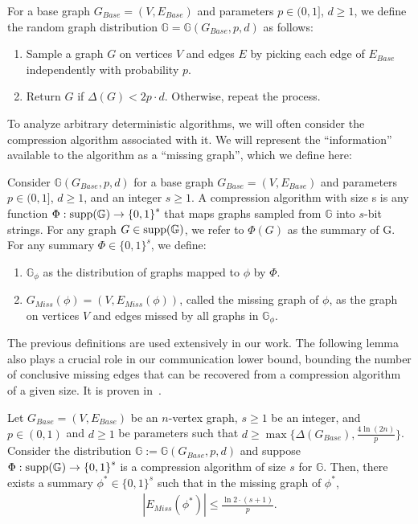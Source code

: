 \documentclass[11pt]{article}
\begin{document}
\begin{definition}
    For a base graph $G_{Base}=(V, E_{Base})$ and parameters $p\in (0, 1]$, $d\ge 1$, we define the random graph distribution $\mathbb{G}=\mathbb{G}(G_{Base}, p, d)$ as follows:
    \begin{enumerate}
        \item Sample a graph $G$ on vertices $V$ and edges $E$ by picking each edge of $E_{Base}$ independently with probability $p$. 
        \item Return $G$ if $\Delta{(G)}< 2p\cdot d$. Otherwise, repeat the process.
    \end{enumerate}
\end{definition}

To analyze arbitrary deterministic algorithms, we will often consider the compression algorithm associated with it. We will represent the ``information'' available to the algorithm as a ``missing graph'', which we define here:
\begin{definition}
    Consider $\mathbb{G}(G_{Base}, p, d)$ for a base graph $G_{Base}=(V, E_{Base})$ and parameters $p\in(0, 1]$, $d\ge 1$, and an integer $s\ge 1$. A compression algorithm with size s is any function $\Phi : \textnormal{\text{supp}}(\mathbb{G}) \rightarrow {\{0, 1\}}^s$ that maps graphs sampled from $\mathbb{G}$ into $s$-bit strings. For any graph $G\in \textnormal{\text{supp}}(\mathbb{G})$, we refer to $\Phi(G)$ as the summary of G. For any summary $\Phi\in{\{0,1\}}^s$, we define:
    \begin{enumerate}
        \item $\mathbb{G}_{\phi}$ as the distribution of graphs mapped to $\phi$ by $\Phi$. 
        \item $G_{Miss}(\phi)=(V, E_{Miss}(\phi))$, called the missing graph of $\phi$, as the graph on vertices $V$ and edges missed by all graphs in $\mathbb{G}_{\phi}$. 
    \end{enumerate}
\end{definition}

The previous definitions are used extensively in our work. The following lemma also plays a crucial role in our communication lower bound, bounding the number of conclusive missing edges that can be recovered from a compression algorithm of a given size. It is proven in~\cite{assadi2022deterministic}.

\begin{lemma}\label{compression}
Let $G_{Base}=(V, E_{Base})$ be an $n$-vertex graph, $s\ge 1$ be an integer, and $p\in (0, 1)$ and $d\ge 1$ be parameters such that $d\ge \max\{\Delta{(G_{Base})}, \frac {4\ln(2n)}p\}$. Consider the distribution $\mathbb{G}:=\mathbb{G}(G_{Base}, p, d)$ and suppose $\Phi:\textnormal{\text{supp}}(\mathbb{G})\rightarrow {\{0, 1\}}^s$ is a compression algorithm of size $s$ for $\mathbb{G}$. Then, there exists a summary $\phi^*\in {\{0, 1\}}^s$ such that in the missing graph of $\phi^*$,
\begin{align*}
    |E_{Miss}(\phi^*)|\le \frac{\ln 2\cdot (s+1)}p.
\end{align*}
\end{lemma}
\end{document}
